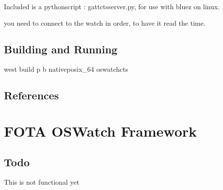 \documentclass[letterpaper,10pt,english]{sphinxmanual}
\begin{document}
Included is a python\sphinxhyphen{}script : gatt\sphinxhyphen{}cts\sphinxhyphen{}server.py, for use with bluez on linux.

\begin{sphinxVerbatim}[commandchars=\\\{\}]
 
\end{sphinxVerbatim}

you need to connect to the watch in order, to have it read the time.

\begin{sphinxVerbatim}[commandchars=\\\{\}]
      
      
\end{sphinxVerbatim}


\subsection{Building and Running}
\label{\detokenize{samples/apposwatch-ctsREADME:building-and-running}}
west build \sphinxhyphen{}p \sphinxhyphen{}b  native\sphinxhyphen{}posix\_64 oswatch\sphinxhyphen{}cts


\subsection{References}
\label{\detokenize{samples/apposwatch-ctsREADME:references}}

\section{FOTA OSWatch Framework}
\label{\detokenize{samples/apposwatch-fotaREADME:fota-oswatch-framework}}\label{\detokenize{samples/apposwatch-fotaREADME:oswatch}}\label{\detokenize{samples/apposwatch-fotaREADME::doc}}

\subsection{Todo}
\label{\detokenize{samples/apposwatch-fotaREADME:todo}}
This is not functional yet
\end{document}
